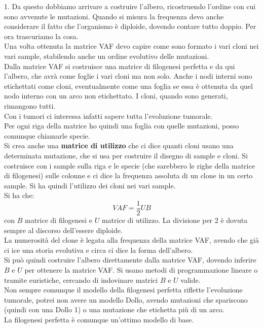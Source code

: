 \documentclass[a4paper,12pt, oneside]{book}
\begin{document}
1. Da questo dobbiamo arrivare a costruire l'albero, ricostruendo l'ordine con
cui sono avvenute le mutazioni. Quando si misura la frequenza devo anche
considerare il fatto che l'organismo è diploide, dovendo contare tutto
doppio. Per ora trascuriamo la cosa.\\
Una volta ottenuta la matrice VAF devo capire come sono formato i vari cloni nei
vari sample, stabilendo anche un ordine evolutivo delle mutazioni.\\
Dalla matrice VAF si costruisce una matrice di filogenesi perfetta e da qui
l'albero, che avrà come foglie i vari cloni ma non solo. Anche i nodi interni
sono etichettati come cloni, eventualmente come una foglia se essa è ottenuta da
quel nodo interno con un arco non etichettato. I cloni, quando sono generati,
rimangono tutti.\\ 
Con i tumori ci interessa infatti sapere tutta l'evoluzione tumorale.\\
Per ogni riga della matrice ho quindi una foglia con quelle mutazioni, posso
comunque chiamarle specie.\\
Si crea anche una \textbf{matrice di utilizzo} che ci dice quanti cloni usano
una determinata mutazione, che si usa per costruire il disegno di sample e
cloni. Si costruisce con i sample sulla riga e le specie (che sarebbero le righe
della matrice di filogenesi) sulle colonne e ci dice
la frequenza assoluta di un clone in un certo sample. Si ha quindi l'utilizzo
dei cloni nei vari sample. \\
Si ha che:
\[VAF=\frac{1}{2}UB\]
con $B$ matrice di filogenesi e $U$ matrice di utilizzo. La divisione per 2 è
dovuta sempre al discorso dell'essere diploide.\\
La numerosità del clone è legata alla frequenza della matrice VAF, avendo che
già ci ice una storia evolutiva e circa ci dice la forma dell'albero. \\
Si può quindi costruire l'albero direttamente dalla matrice VAF, dovendo
inferire $B$ e $U$ per ottenere la matrice VAF. Si usano metodi di
programmazione lineare o tramite euristiche, cercando di indovinare matrici $B$
e $U$ valide.\\
Non sempre comunque il modello della filogenesi perfetta riflette l'evoluzione
tumorale, potrei non avere un modello Dollo, avendo mutazioni che spariscono
(quindi con una Dollo 1) o una mutazione che etichetta più di un arco.\\
La filogenesi perfetta è comunque un'ottimo modello di base.
\end{document}
